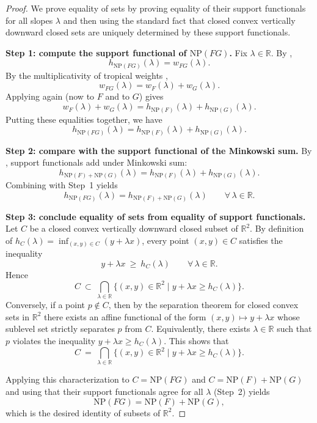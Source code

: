 \begin{proof}
 
  We prove equality of sets by proving equality of their support functionals for all slopes $\lambda$ and then using
  the standard fact that closed convex vertically downward closed sets are uniquely determined by these support functionals.

  \textbf{Step 1: compute the support functional of $\mathrm{NP}(FG)$.}
  Fix $\lambda\in\mathbb{R}$.
  By ,
  \[
    h_{\mathrm{NP}(FG)}(\lambda)=w_{FG}(\lambda).
  \]
  By the multiplicativity of tropical weights ,
  \[
    w_{FG}(\lambda)=w_F(\lambda)+w_G(\lambda).
  \]
  Applying  again (now to $F$ and to $G$) gives
  \[
    w_F(\lambda)+w_G(\lambda)=h_{\mathrm{NP}(F)}(\lambda)+h_{\mathrm{NP}(G)}(\lambda).
  \]
  Putting these equalities together, we have
  \[
    h_{\mathrm{NP}(FG)}(\lambda)=h_{\mathrm{NP}(F)}(\lambda)+h_{\mathrm{NP}(G)}(\lambda).
  \]

  \textbf{Step 2: compare with the support functional of the Minkowski sum.}
  By , support functionals add under Minkowski sum:
  \[
    h_{\mathrm{NP}(F)+\mathrm{NP}(G)}(\lambda)=h_{\mathrm{NP}(F)}(\lambda)+h_{\mathrm{NP}(G)}(\lambda).
  \]
  Combining with Step~1 yields
  \[
    h_{\mathrm{NP}(FG)}(\lambda)=h_{\mathrm{NP}(F)+\mathrm{NP}(G)}(\lambda)\qquad \forall\,\lambda\in\mathbb{R}.
  \]

  \textbf{Step 3: conclude equality of sets from equality of support functionals.}
  Let $C$ be a closed convex vertically downward closed subset of $\mathbb{R}^2$.
  By definition of $h_C(\lambda)=\inf_{(x,y)\in C}(y+\lambda x)$, every point $(x,y)\in C$ satisfies the inequality
  \[
    y+\lambda x\ \ge\ h_C(\lambda)\qquad \forall\,\lambda\in\mathbb{R}.
  \]
  Hence
  \[
    C\ \subset\ \bigcap_{\lambda\in\mathbb{R}}\{(x,y)\in\mathbb{R}^2 \mid y+\lambda x\ge h_C(\lambda)\}.
  \]
  Conversely, if a point $p\notin C$, then by the separation theorem for closed convex sets in $\mathbb{R}^2$
  there exists an affine functional of the form $(x,y)\mapsto y+\lambda x$ whose sublevel set strictly separates $p$ from $C$.
  Equivalently, there exists $\lambda\in\mathbb{R}$ such that $p$ violates the inequality
  $y+\lambda x\ge h_C(\lambda)$.
  This shows that
  \[
    C\ =\ \bigcap_{\lambda\in\mathbb{R}}\{(x,y)\in\mathbb{R}^2 \mid y+\lambda x\ge h_C(\lambda)\}.
  \]

  Applying this characterization to $C=\mathrm{NP}(FG)$ and $C=\mathrm{NP}(F)+\mathrm{NP}(G)$ and using that their
  support functionals agree for all $\lambda$ (Step~2) yields
  \[
    \mathrm{NP}(FG)=\mathrm{NP}(F)+\mathrm{NP}(G),
  \]
  which is the desired identity of subsets of $\mathbb{R}^2$.
\end{proof}

